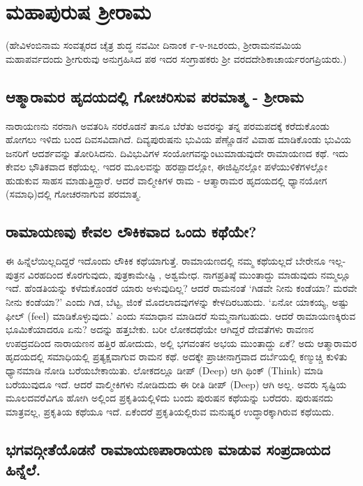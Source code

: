 \chapter{ಮಹಾಪುರುಷ ಶ್ರೀರಾಮ}

(ಹೇವಿಳಂಬಿನಾಮ ಸಂವತ್ಸರದ ಚೈತ್ರ ಶುದ್ಧ ನವಮೀ ದಿನಾಂಕ ೯-೪-೫೭ರಂದು, ಶ್ರೀರಾಮನವಮಿಯ ಮಹಾಪರ್ವದಂದು ಶ್ರೀಗುರುವು ಅನುಗ್ರಹಿಸಿದ ಪಠ ಇದರ ಸಂಗ್ರಾಹಕರು ಶ್ರೀ ವರದದೇಶಿಕಾಚಾರ್ಯರಂಗಪ್ರಿಯರು.)

\section*{ಆತ್ಮಾರಾಮರ ಹೃದಯದಲ್ಲಿ ಗೋಚರಿಸುವ ಪರಮಾತ್ಮ - ಶ್ರೀರಾಮ}

ನಾರಾಯಣನು ನರನಾಗಿ ಅವತರಿಸಿ ನರರೊಡನೆ ತಾನೂ ಬೆರೆತು ಅವರನ್ನು ತನ್ನ ಪರಮಪದಕ್ಕೆ ಕರೆದುಕೊಂಡು ಹೋಗಲು ಇಳಿದು ಬಂದ ದಿವಸವಿದಾಗಿದೆ. ದಿವ್ಯಪುರುಷನು ಭುವಿಯ ಪೆಣ್ಣೊಡನೆ ವಿವಾಹ ಮಾಡಿಕೊಂಡು ಭುವಿಯ ಜನರಿಗೆ ಆದರ್ಶವನ್ನು ತೋರಿಸಿದನು. ದಿವಿಭುವಿಗಳ ಸಂಯೋಗವನ್ನುಂಟುಮಾಡುವುದೇ ರಾಮಾಯಣದ ಕಥೆ. ಇದು ಕೇವಲ ಭೌತಿಕವಾದ ಕಥೆಯಲ್ಲ. ಇದರ ಮೂಲವನ್ನು ಹರಪ್ಪಾದಲ್ಲೋ, ಈಜಿಪ್ಟಿನಲ್ಲೋ ಪಳೆಯುಳಿಕೆಗಳಲ್ಲೋ ಹುಡುಕುವ ಸಾಹಸ ಮಾಡುತ್ತಿದ್ದಾರೆ. ಆದರೆ ವಾಲ್ಮೀಕಿಗಳ ರಾಮ - ಆತ್ಮಾರಾಮರ ಹೃದಯದಲ್ಲಿ ಧ್ಯಾನಯೋಗ (ಸಮಾಧಿ)ದಲ್ಲಿ ಗೋಚರನಾಗುವ ಪರಮಾತ್ಮ.

\section*{ರಾಮಾಯಣವು ಕೇವಲ ಲೌಕಿಕವಾದ ಒಂದು ಕಥೆಯೇ?}

ಈ ಹಿನ್ನೆಲೆಯಿಲ್ಲದಿದ್ದರೆ ಇದೊಂದು ಲೌಕಿಕ ಕಥೆಯಾಗುತ್ತೆ. ರಾಮಾಯಣದಲ್ಲಿ ನಮ್ಮ ಕಥೆಯಲ್ಲದೆ ಬೇರೇನೂ ಇಲ್ಲ- ಪುತ್ರನ ವಿರಹದಿಂದ ಕೊರಗುವುದು, ಪುತ್ರಕಾಮೇಷ್ಟಿ , ಅಶ್ವಮೇಧ. ನಾಗಪ್ರತಿಷ್ಠೆ ಮುಂತಾದ್ದು ಮಾಡುವುದು ನಮ್ಮಲ್ಲೂ ಇದೆ. ಹೆಂಡತಿಯನ್ನು ಕಳೆದುಕೊಂಡರೆ ಯಾರು ಅಳುವುದಿಲ್ಲ? ಆದರೆ ರಾಮನಂತೆ `ಗಿಡವೇ ನೀನು ಕಂಡೆಯಾ? ಮರವೇ ನೀನು ಕಂಡೆಯಾ?' ಎಂದು ಗಿಡ, ಬೆಟ್ಟ, ಜಿಂಕೆ ಮೊದಲಾದವುಗಳನ್ನು ಕೇಳದಿರಬಹುದು. `ಏನೋ ಯಾಕಯ್ಯ, ಅಷ್ಟು ಫೀಲ್ ({\eng feel}) ಮಾಡಿಕೊಳ್ಳುವುದು.' ಎಂದು ಸಮಾಧಾನ ಮಾಡಿದರೆ ಸುಮ್ಮನಾಗಬಹುದು. ಆದರೆ ರಾಮಾಯಣಕ್ಕಿರುವ ಭೂಮಿಕೆಯಾದರೂ ಏನು? ಅದನ್ನು ಹತ್ತಬೇಕು. ಬರೀ ಲೋಕದಥೆಯೇ ಆಗಿದ್ದರೆ ದೇವತೆಗಳು ರಾವಣನ ಉಪದ್ರವದಿಂದ ನಾರಾಯಣನ ಹತ್ತಿರ ಹೋದುದು, ಅಲ್ಲಿ ಭಗವಂತನ ಅಭಯ ಮುಂತಾದ್ದು ಏಕೆ? ಅದು ಆತ್ಮಾರಾಮರ ಹೃದಯದಲ್ಲಿ ಸಮಾಧಿಯಲ್ಲಿ ಪ್ರತ್ಯಕ್ಷವಾಗುವ ರಾಮನ ಕಥೆ. ಅದಕ್ಕೇ ಪ್ರಾಚೀನಾಗ್ರವಾದ ದರ್ಬೆಯಲ್ಲಿ ಕಣ್ಮುಚ್ಚಿ ಕುಳಿತು ಧ್ಯಾನಮಾಡಿ ನೋಡಿ ಬರೆಯಬೇಕಾಯಿತು. ಲೋಕದಲ್ಲೂ ಡೀಪ್ ({\eng Deep}) ಆಗಿ ಥಿಂಕ್ ({\eng Think}) ಮಾಡಿ ಬರೆಯುವುದೂ ಇದೆ. ಆದರೆ ವಾಲ್ಮೀಕಿಗಳು ನೋಡಿದುದು ಈ ರೀತಿ ಡೀಪ್ ({\eng Deep}) ಆಗಿ ಅಲ್ಲ. ಅವರು ಸೃಷ್ಟಿಯ ಮೂಲದವರೆವಿಗೂ ಹೋಗಿ ಅಲ್ಲಿಂದ ಪ್ರಕೃತಿಯಲ್ಲಿಳಿದು ಬಂದು ಪುರುಷನ ಕಥೆಯನ್ನು ಬರೆದರು. ಪುರುಷನದು ಮಾತ್ರವಲ್ಲ, ಪ್ರಕೃತಿಯ ಕಥೆಯೂ ಇದೆ. ಏಕೆಂದರೆ ಪ್ರಕೃತಿಯಲ್ಲಿರುವ ಮನುಷ್ಯರ ಉದ್ಧಾರಕ್ಕಾಗಿರುವ ಕಥೆಯಿದು.

\section*{ಭಗವದ್ಗೀತೆಯೊಡನೆ ರಾಮಾಯಣಪಾರಾಯಣ ಮಾಡುವ ಸಂಪ್ರದಾಯದ ಹಿನ್ನೆಲೆ.}

